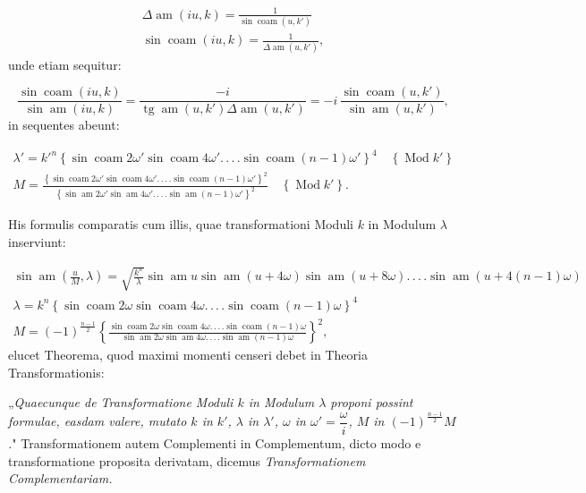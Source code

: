 \documentclass{article}
\begin{document}
\[
\begin{gathered}
\Delta\operatorname{am}(iu,k)=\frac{1}{\sin\operatorname{coam}(u,k')}\\[1.5ex]
\sin\operatorname{coam}(iu,k)=\frac{1}{\Delta\operatorname{am}(u,k')},
\end{gathered}
\]
unde etiam sequitur:

\[
\frac{\sin\operatorname{coam}(iu,k)}{\sin\operatorname{am}(iu,k)}=\frac{-i}{\operatorname{tg}\operatorname{am}(u,k')\Delta\operatorname{am}(u,k')}=-i\,\frac{\sin\operatorname{coam}(u,k')}{\sin\operatorname{am}(u,k')},
\]
in sequentes abeunt:

\[
\begin{gathered}
\lambda'=k'^{n}\left\{\sin\operatorname{coam}2\omega'\sin\operatorname{coam}4\omega'.\,.\,.\,.\sin\operatorname{coam}(n-1)\omega'\right\}^{4}\quad\left\{\operatorname{Mod}k'\right\}\\[2ex]
M=\frac{\left\{\sin\operatorname{coam}2\omega'\sin\operatorname{coam}4\omega'.\,.\,.\,.\sin\operatorname{coam}(n-1)\omega'\right\}^{2}}{\left\{\sin\operatorname{am}2\omega'\sin\operatorname{am}4\omega'.\,.\,.\,.\sin\operatorname{am}(n-1)\omega'\right\}^{2}}\quad\left\{\operatorname{Mod}k'\right\}.
\end{gathered}
\]

His formulis comparatis cum illis, quae transformationi Moduli $k$ in Modulum $\lambda$ inserviunt:

\[
\begin{gathered}
\sin\operatorname{am}\left(\frac{u}{M},\lambda\right)=\sqrt{\frac{k^{n}}{\lambda}}\sin\operatorname{am}u\sin\operatorname{am}(u+4\omega)\sin\operatorname{am}(u+8\omega).\,.\,.\,.\sin\operatorname{am}(u+4(n-1)\omega)\\[1.5ex]
\lambda=k^{n}\left\{\sin\operatorname{coam}2\omega\sin\operatorname{coam}4\omega.\,.\,.\,.\sin\operatorname{coam}(n-1)\omega\right\}^{4}\\[1.5ex]
M=(-1)^{\frac{n-1}{2}}\left\{\frac{\sin\operatorname{coam}2\omega\sin\operatorname{coam}4\omega.\,.\,.\,.\sin\operatorname{coam}(n-1)\omega}{\sin\operatorname{am}2\omega\sin\operatorname{am}4\omega.\,.\,.\,.\sin\operatorname{am}(n-1)\omega}\right\}^{2},
\end{gathered}
\]
elucet Theorema, quod maximi momenti censeri debet in Theoria Transformationis:

„\emph{Quaecunque de Transformatione Moduli $k$ in Modulum $\lambda$ proponi possint formulae, easdam valere, mutato $k$ in $k'$, $\lambda$ in $\lambda'$, $\omega$ in $\omega'=\dfrac{\omega}{i}$, $M$ in $(-1)^{\frac{n-1}{2}}M$.}"
Transformationem autem Complementi in Complementum, dicto modo e transformatione proposita derivatam, dicemus \emph{Transformationem Complementariam.}
\end{document}
